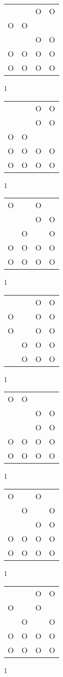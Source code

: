 \begin{tabular}{|m{0.2cm}m{0.2cm}m{0.2cm}m{0.2cm}|}\hline
 & &O&O\\
O&O& & \\
 & &O&O\\
O&O&O&O\\
O&O&O&O\\
\hline\end{tabular}1
\begin{tabular}{|m{0.2cm}m{0.2cm}m{0.2cm}m{0.2cm}|}\hline
 & &O&O\\
 & &O&O\\
O&O& & \\
O&O&O&O\\
O&O&O&O\\
\hline\end{tabular}1
\begin{tabular}{|m{0.2cm}m{0.2cm}m{0.2cm}m{0.2cm}|}\hline
O& &O& \\
 & &O&O\\
 &O& &O\\
O&O&O&O\\
O&O&O&O\\
\hline\end{tabular}1
\begin{tabular}{|m{0.2cm}m{0.2cm}m{0.2cm}m{0.2cm}|}\hline
 & &O&O\\
O& &O&O\\
O& &O&O\\
 &O&O&O\\
 &O&O&O\\
\hline\end{tabular}1
\begin{tabular}{|m{0.2cm}m{0.2cm}m{0.2cm}m{0.2cm}|}\hline
O&O& & \\
 & &O&O\\
 & &O&O\\
O&O&O&O\\
O&O&O&O\\
\hline\end{tabular}1
\begin{tabular}{|m{0.2cm}m{0.2cm}m{0.2cm}m{0.2cm}|}\hline
O& &O& \\
 &O& &O\\
 & &O&O\\
O&O&O&O\\
O&O&O&O\\
\hline\end{tabular}1
\begin{tabular}{|m{0.2cm}m{0.2cm}m{0.2cm}m{0.2cm}|}\hline
 & &O&O\\
O& &O& \\
 &O& &O\\
O&O&O&O\\
O&O&O&O\\
\hline\end{tabular}1
